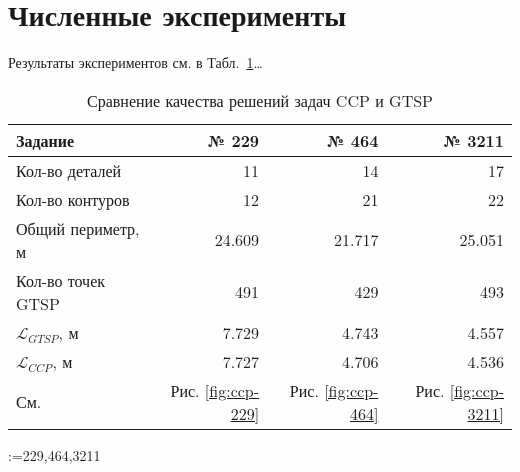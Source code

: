 
\section{Численные эксперименты}
\label{sec:ccp.exp}

Результаты экспериментов см. в Табл.~\ref{tab:ccp-vs-gtsp}\dots

\begin{table}[b]
  \centering
  \caption{Сравнение качества решений задач CCP и GTSP}
  \label{tab:ccp-vs-gtsp}
  \def\arraystretch{1.2}
  \begin{tabular}{l|*{3}{r}}
      Задание & № 229 & № 464 & № 3211 \\
      \hline
      Кол-во деталей & 11 & 14 & 17\\
      Кол-во контуров & 12 & 21 & 22 \\
      Общий периметр, м & 24.609 & 21.717 & 25.051 \\
      Кол-во точек GTSP & 491 & 429 & 493 \\
      $\mathcal L_{GTSP}$, м & 7.729 & 4.743 & 4.557 \\
      $\mathcal L_{CCP}$, м & 7.727 & 4.706 & 4.536 \\
      См. & Рис. \ref{fig:ccp-229} & Рис. \ref{fig:ccp-464} & Рис. \ref{fig:ccp-3211} \\
      \hline
  \end{tabular}
\end{table}

\makeatletter
  \@for\job:={229,464,3211}
\makeatother
